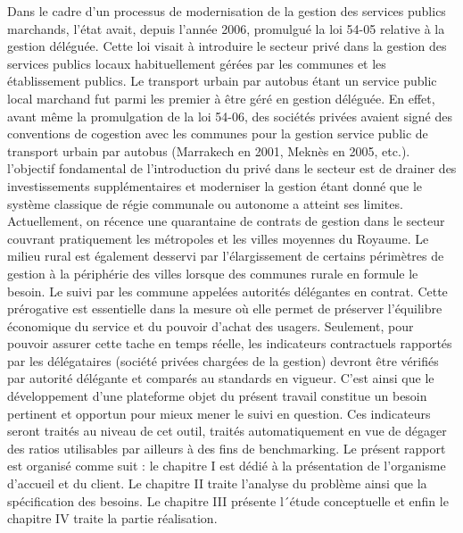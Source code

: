 Dans le cadre d’un processus de modernisation de la gestion des services publics marchands, l’état avait, depuis l’année 2006, promulgué la loi 54-05 relative à la gestion déléguée.  Cette loi visait à introduire le secteur privé dans la gestion des services publics locaux habituellement gérées par les communes et les établissement publics. Le transport urbain par autobus étant un service public local marchand fut parmi les premier à être géré en gestion déléguée. En effet, avant même la promulgation de la loi 54-06, des sociétés privées avaient signé des conventions de cogestion avec les communes pour la gestion service public de transport urbain par autobus (Marrakech en 2001, Meknès en 2005, etc.).
l’objectif fondamental de l’introduction du privé dans le secteur est de drainer des investissements supplémentaires  et moderniser la gestion étant donné que le système classique de régie communale ou autonome a atteint ses limites.
Actuellement, on récence une quarantaine de contrats de gestion dans le secteur couvrant pratiquement les métropoles et les villes moyennes du Royaume. Le milieu rural est également desservi par l’élargissement de certains périmètres de gestion à la périphérie des villes lorsque des communes rurale en formule le besoin. Le suivi par les commune appelées autorités délégantes en contrat. Cette prérogative est essentielle dans la mesure où elle permet de préserver l’équilibre économique du service et du pouvoir d’achat des usagers. Seulement, pour pouvoir assurer cette tache en temps réelle, les indicateurs contractuels rapportés par les délégataires (société privées chargées de la gestion) devront être vérifiés par autorité délégante et comparés au standards en vigueur.  C’est ainsi que le développement d’une plateforme objet du présent travail constitue un besoin pertinent et opportun pour mieux mener le suivi en question. Ces indicateurs seront traités au niveau de cet outil, traités automatiquement en vue de dégager des ratios utilisables par ailleurs à des fins de benchmarking.
Le présent rapport est organisé comme suit : le chapitre I est dédié à la présentation de l’organisme d’accueil et du client. Le chapitre II traite l’analyse du problème ainsi que la spécification des besoins. Le chapitre III présente l´étude conceptuelle et enfin le chapitre IV traite la partie réalisation.
